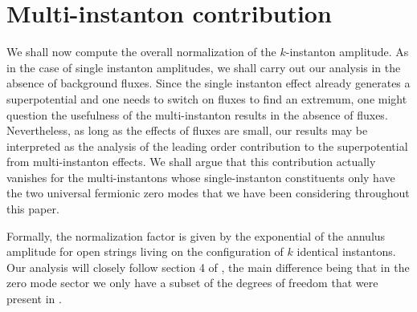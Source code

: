 \documentclass[12pt,a4paper]{article}
\begin{document}
\section{Multi-instanton contribution} \label{smulti}

We shall now compute  the overall normalization of the
$k$-instanton amplitude. As in the case of single instanton amplitudes, we shall carry out
our analysis in the absence of background fluxes. Since the single instanton effect already
generates a superpotential and one needs to switch on fluxes to find an extremum, one might
question the usefulness of the multi-instanton results in the absence of fluxes.
Nevertheless, as long as the effects of fluxes are small, our results may be interpreted as
the analysis of the leading order contribution to the superpotential from multi-instanton effects.
We shall argue that this contribution actually vanishes for the multi-instantons whose
single-instanton constituents only have the two universal fermionic zero modes
that we have been considering throughout this paper.

Formally, the normalization factor is given by the exponential of the annulus amplitude for open
strings living on the configuration of $k$ identical instantons.
Our analysis will closely follow section 4 of \cite{Alexandrov:2021shf}, the main difference being that in the zero
mode sector we only have a subset of the degrees of freedom that were present in
\cite{Alexandrov:2021shf}.
\end{document}
